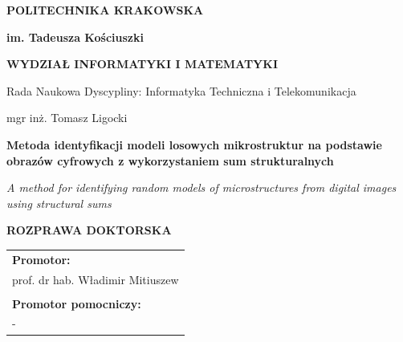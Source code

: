 \documentclass[12pt,a4paper,twoside,openright]{report}
\theoremstyle{definition}
\theoremstyle{remark}
\begin{document}
\begin{titlepage}
    \centering
    
    {\fontsize{14}{16}\selectfont\bfseries POLITECHNIKA KRAKOWSKA \par}
    {\fontsize{13}{15}\selectfont\bfseries im. Tadeusza Kościuszki \par}
    \vspace{0.4cm}
    {\fontsize{12}{14}\selectfont\bfseries WYDZIAŁ INFORMATYKI I MATEMATYKI \par}
    \vspace{0.2cm}
    {\fontsize{11}{13}\selectfont Rada Naukowa Dyscypliny: Informatyka Techniczna i Telekomunikacja \par}
    
    \vspace{2.5cm}
    
    {\fontsize{13}{15}\selectfont mgr inż. Tomasz Ligocki \par}
    
    \vspace{2.0cm}
    
    {\fontsize{16}{19}\selectfont\bfseries Metoda identyfikacji modeli losowych mikrostruktur na podstawie obrazów cyfrowych z wykorzystaniem sum strukturalnych \par}
    
    \vspace{0.6cm}
    
    {\fontsize{12}{14}\selectfont\itshape A method for identifying random models of microstructures from digital images using structural sums \par}
    
    \vspace{2.5cm}
    
    {\fontsize{12}{14}\selectfont\bfseries ROZPRAWA DOKTORSKA \par}
    
    \vfill
    
    \begin{flushright}
    \fontsize{11}{13}\selectfont
    \begin{tabular}{l}
        \textbf{Promotor:} \\
        prof. dr hab. Władimir Mitiuszew \\
        \rule{0pt}{3ex} \\ %
        \textbf{Promotor pomocniczy:} \\
        -
    \end{tabular}
    \end{flushright}
    

\end{titlepage}
\end{document}
